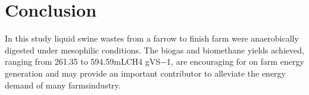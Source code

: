 \section{Conclusion}
In this study liquid swine wastes from a farrow to finish farm were anaerobically digested under mesophilic conditions. The biogas and biomethane yields achieved, ranging from 261.35 to 594.59mLCH4 gVS−1, are encouraging for on farm energy generation and may provide an important contributor to alleviate the energy demand of many farmsindustry.